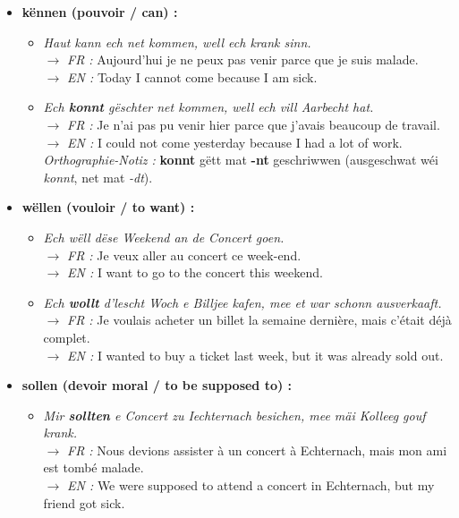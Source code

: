 \begin{itemize}
    \item \textbf{kënnen (pouvoir / can) :}
    \begin{itemize}
        \item \textit{Haut kann ech net kommen, well ech krank sinn.} \\
        $\rightarrow$ \textit{FR :} Aujourd'hui je ne peux pas venir parce que je suis malade. \\
        $\rightarrow$ \textit{EN :} Today I cannot come because I am sick.
        \item \textit{Ech \textbf{konnt} gëschter net kommen, well ech vill Aarbecht hat.} \\
        $\rightarrow$ \textit{FR :} Je n'ai pas pu venir hier parce que j'avais beaucoup de travail. \\
        $\rightarrow$ \textit{EN :} I could not come yesterday because I had a lot of work. \\
        \textit{Orthographie-Notiz :} \textbf{konnt} gëtt mat \textbf{-nt} geschriwwen (ausgeschwat wéi \textit{konnt}, net mat \textit{-dt}).
    \end{itemize}

    \vspace{0.3em}

    \item \textbf{wëllen (vouloir / to want) :}
    \begin{itemize}
        \item \textit{Ech wëll dëse Weekend an de Concert goen.} \\
        $\rightarrow$ \textit{FR :} Je veux aller au concert ce week-end. \\
        $\rightarrow$ \textit{EN :} I want to go to the concert this weekend.
        \item \textit{Ech \textbf{wollt} d'lescht Woch e Billjee kafen, mee et war schonn ausverkaaft.} \\
        $\rightarrow$ \textit{FR :} Je voulais acheter un billet la semaine dernière, mais c'était déjà complet. \\
        $\rightarrow$ \textit{EN :} I wanted to buy a ticket last week, but it was already sold out.
    \end{itemize}

    \vspace{0.3em}

    \item \textbf{sollen (devoir moral / to be supposed to) :}
    \begin{itemize}
        \item \textit{Mir \textbf{sollten} e Concert zu Iechternach besichen, mee mäi Kolleeg gouf krank.} \\
        $\rightarrow$ \textit{FR :} Nous devions assister à un concert à Echternach, mais mon ami est tombé malade. \\
        $\rightarrow$ \textit{EN :} We were supposed to attend a concert in Echternach, but my friend got sick.
    \end{itemize}


\end{itemize}
